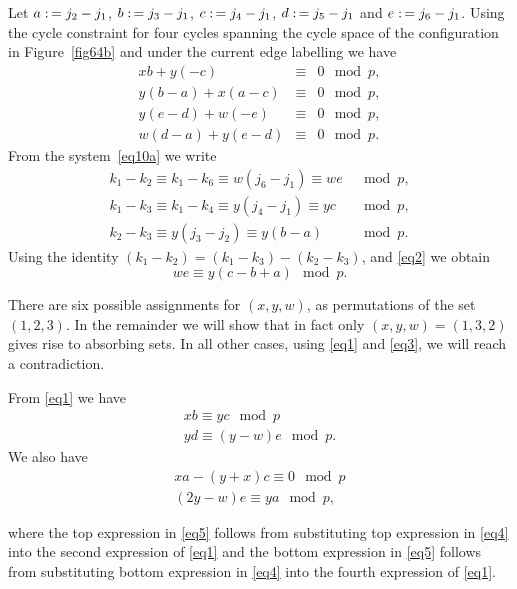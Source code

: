 Let $a\asn j_2-j_1$, $b\asn j_3-j_1$, $c\asn j_4-j_1$, $d\asn
j_5-j_1$ and $e\asn j_6-j_1$. Using the cycle constraint for  four
cycles spanning the cycle space of the configuration in
Figure~\ref{fig64b} and under the current edge labelling we have
\begin{equation}\label{eq1}\begin{array}{cccc}
xb+y(-c) &\equiv &0 \mod p, \\
y(b-a)+x(a-c) &\equiv &0 \mod p, \\
y(e-d) +w(-e) &\equiv &0 \mod p, \\
w(d-a)+y(e-d)&\equiv &0 \mod p .\end{array}\end{equation}
From the
system~\eqref{eq10a} we write
\begin{equation}\label{eq2}\begin{array}{lll}
k_1 -k_2 \equiv k_1-k_6 \equiv w(j_6-j_1) \equiv we &\mod p,\\
k_1-k_3 \equiv k_1 -k_4 \equiv y(j_4-j_1) \equiv yc &\mod p,\\
k_2 -k_3 \equiv y(j_3-j_2) \equiv y(b-a) &\mod p.
\end{array}\end{equation}
Using the identity $(k_1-k_2)=(k_1-k_3)-(k_2-k_3)$, and \eqref{eq2}
we obtain
\begin{equation}\label{eq3}
we \equiv y(c-b+a) \mod p.
\end{equation}

There are six possible assignments for $(x,y,w)$, as permutations of
the set $(1,2,3)$. In the remainder we will show that in fact only
$(x,y,w)=(1,3,2)$ gives rise to absorbing sets. In all other cases,
using \eqref{eq1} and \eqref{eq3}, we will reach a contradiction.

From \eqref{eq1} we have
\begin{equation}\label{eq4}\begin{array}{ccc}
xb \equiv yc \mod p\\
yd \equiv (y-w)e \mod p.
\end{array}\end{equation}
We also have
\begin{equation}\label{eq5}\begin{array}{ccc}
xa -(y+x)c \equiv 0 \mod p\\
(2y-w)e \equiv ya \mod p,
\end{array}\end{equation}

where the top expression in \eqref{eq5} follows from substituting
top expression in \eqref{eq4} into the second expression of
\eqref{eq1} and the bottom expression in \eqref{eq5} follows from
substituting bottom expression in \eqref{eq4} into the fourth
expression of \eqref{eq1}.

